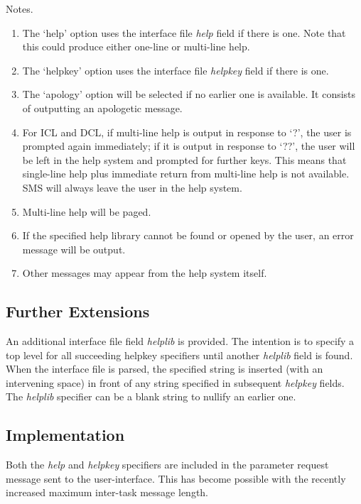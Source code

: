 Notes.
\begin{enumerate}
\item The `help' option uses the interface file {\em help} field if there is
one. Note that this could produce either one-line or multi-line help.

\item The `helpkey' option uses the interface file {\em helpkey} field if
there is one.

\item The `apology' option will be selected if no earlier one is available.
It consists of outputting an apologetic message. 

\item For ICL and DCL, if multi-line help is output in response to `?', the 
user is prompted again immediately; if it is output in response to `??',
the user will be left in the help system and prompted for further keys.
This means that single-line help plus immediate return from multi-line
help is not available. SMS will always leave the user in the help system.

\item Multi-line help will be paged.

\item If the specified help library cannot be found or opened by the user,
an error message will be output.

\item Other messages may appear from the help system itself.
\end{enumerate}

\subsection{Further Extensions}
An additional interface file field {\em helplib} is provided.
The intention is to specify a top level for all succeeding helpkey specifiers 
until another {\em helplib} field is found. 
When the interface file is parsed, the specified string is inserted (with 
an intervening space) in front of any string specified in subsequent 
{\em helpkey} fields. 
The {\em helplib} specifier can be a blank string to nullify an earlier one.

\subsection{Implementation}
Both the {\em help} and {\em helpkey} specifiers are included in the parameter 
request message sent to the user-interface. 
This has become possible with the recently increased maximum inter-task
message length.


